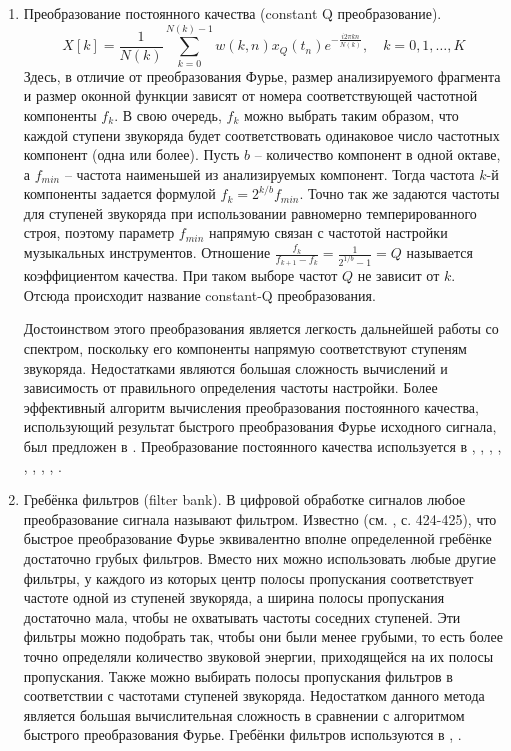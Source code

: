 \begin{enumerate}
  \item Преобразование постоянного качества (constant Q преобразование).
  $$X[k] = \frac{1}{N(k)} \sum_{k=0}^{N(k)-1} w(k,n)x_Q(t_n) e^{-\frac{i 2\pi
  kn}{N(k)}}, \quad k=0, 1, \ldots, K$$ Здесь, в отличие от преобразования
  Фурье, размер анализируемого фрагмента и размер оконной функции зависят от
  номера соответствующей частотной компоненты $f_k$. В свою очередь, $f_k$ можно
  выбрать таким образом, что каждой ступени звукоряда будет соответствовать
  одинаковое число частотных компонент (одна или более). Пусть $b$ -- количество
  компонент в одной октаве, а $f_{min}$ -- частота наименьшей из анализируемых
  компонент. Тогда частота $k$-й компоненты задается формулой $f_k = 2^{k/b}
  f_{min}$. Точно так же задаются частоты для ступеней звукоряда при
  использовании равномерно темперированного строя, поэтому параметр $f_{min}$
  напрямую связан с частотой настройки музыкальных инструментов. Отношение
  $\frac{f_k}{f_{k+1} - f_k} = \frac{1}{2^{1/b}-1} = Q$ называется коэффициентом
  качества. При таком выборе частот $Q$ не зависит от $k$. Отсюда происходит
  название constant-Q преобразования.
  
  Достоинством этого преобразования является легкость дальнейшей работы со
  спектром, поскольку его компоненты напрямую соответствуют ступеням звукоряда.
  Недостатками являются большая сложность вычислений и зависимость от
  правильного определения частоты настройки. Более эффективный алгоритм
  вычисления преобразования постоянного качества, использующий результат
  быстрого преобразования Фурье исходного сигнала, был предложен в
  \cite{Brown1992}. Преобразование постоянного качества используется в
  \cite{Bello2005}, \cite{Lee2006}, \cite{Mauch2008}, \cite{Mauch2009},
  \cite{Oudre2009}, \cite{Reed2009}, \cite{Cho2010}, \cite{Cho2011},
  \cite{Ni2011}.
  
  \item Гребёнка фильтров (filter bank). В цифровой обработке сигналов любое
  преобразование сигнала называют фильтром. Известно (см. \cite{Rabiner1978}, с.
  424-425), что быстрое преобразование Фурье эквивалентно вполне определенной
  гребёнке достаточно грубых фильтров. Вместо них можно использовать любые
  другие фильтры, у каждого из которых центр полосы пропускания соответствует
  частоте одной из ступеней звукоряда, а ширина полосы пропускания достаточно
  мала, чтобы не охватывать частоты соседних ступеней. Эти фильтры можно
  подобрать так, чтобы они были менее грубыми, то есть более точно определяли
  количество звуковой энергии, приходящейся на их полосы пропускания. Также
  можно выбирать полосы пропускания фильтров в соответствии с частотами ступеней
  звукоряда. Недостатком данного метода является большая вычислительная
  сложность в сравнении с алгоритмом быстрого преобразования Фурье. Гребёнки
  фильтров используются в \cite{Jiang2011}, \cite{Humphrey2012}.
\end{enumerate}

